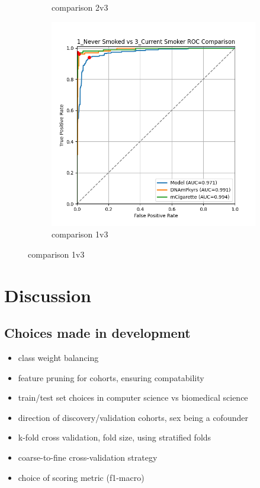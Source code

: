 \documentclass{article}
\begin{document}
\begin{figure}
\begin{subfigure}{0.48\textwidth}
        \caption{comparison 2v3}
    \end{subfigure}
    \par\vspace{0.5em}
    \begin{subfigure}{0.48\textwidth}
        \centering
        \includegraphics[width=\linewidth]{comparison_1v3_roc.png}
        \caption{comparison 1v3}
    \end{subfigure}
\end{figure}

\section{Discussion}

\subsection*{Choices made in development}
\begin{itemize}
    \item class weight balancing
    \item feature pruning for cohorts, ensuring compatability
    \item train/test set choices in computer science vs biomedical science
    \item direction of discovery/validation cohorts, sex being a cofounder
    \item k-fold cross validation, fold size, using stratified folds
    \item coarse-to-fine cross-validation strategy
    \item choice of scoring metric (f1-macro)
\end{itemize}
\end{document}
